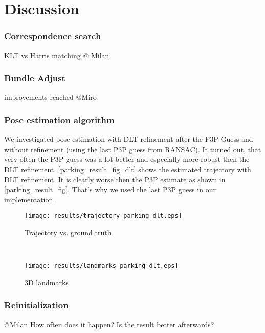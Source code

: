 \section{Discussion}

\subsubsection{Correspondence search}
KLT vs Harris matching
@ Milan

\subsubsection{Bundle Adjust}
improvements reached
@Miro

\subsubsection{Pose estimation algorithm}
We investigated pose estimation with DLT refinement after the P3P-Guess and without refinement (using the last P3P guess from RANSAC). It turned out, that very often the P3P-guess was a lot better and especially more robust then the DLT refinement. \cref{parking_result_fig_dlt} shows the estimated trajectory with DLT refinement. It is clearly worse then the P3P estimate as shown in \cref{parking_result_fig}. That's why we used the last P3P guess in our implementation.
\begin{figure*}[ht!]
    \centering
    \begin{subfigure}[t]{0.5\textwidth}
        \centering
        \texttt{[image: results/trajectory\_parking\_dlt.eps]} 
        \caption{Trajectory vs. ground truth}
    \end{subfigure}%
    ~ 
    \begin{subfigure}[t]{0.5\textwidth}
        \centering
        \texttt{[image: results/landmarks\_parking\_dlt.eps]}
        \caption{3D landmarks}
    \end{subfigure}
    \caption{Parking Dataset Results with DLT refinement (same parameters as for plots in \cref{parking_result_fig})}
		\label{parking_result_fig_dlt}
\end{figure*}

\subsubsection{Reinitialization}
@Milan
How often does it happen? Is the result better afterwards?

